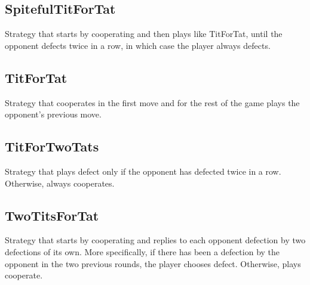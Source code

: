 \subsection{SpitefulTitForTat}
Strategy that starts by cooperating and then plays like TitForTat, until the opponent defects twice in a row, in which case the player always defects.

\subsection{TitForTat}
Strategy that cooperates in the first move and for the rest of the game plays the opponent's previous move.

\subsection{TitForTwoTats}
Strategy that plays defect only if the opponent has defected twice in a row. Otherwise, always cooperates.

\subsection{TwoTitsForTat}
Strategy that starts by cooperating and replies to each opponent defection by two defections of its own. More specifically, if there has been a defection by the opponent in the two previous rounds, the player chooses defect. Otherwise, plays cooperate.
